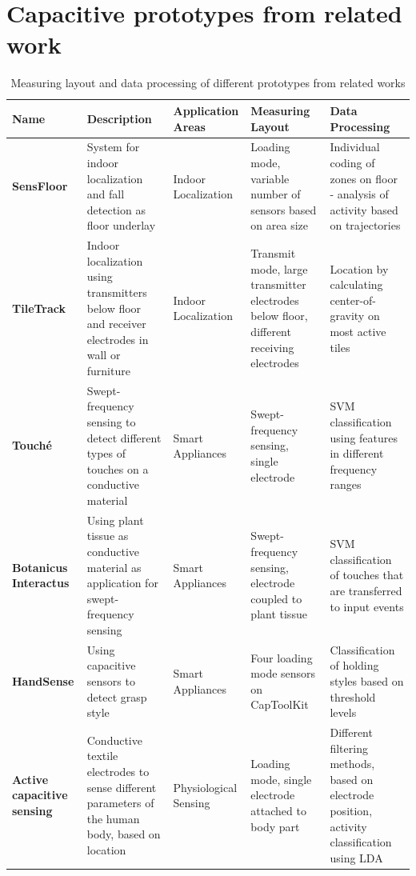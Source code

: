 \section{Capacitive prototypes from related work}
\begin{table}[htbp]	
	\centering
  \footnotesize
  \caption{Measuring layout and data processing of different prototypes from related works}
    \begin{tabularx}{\linewidth}{Xp{3.5cm}Xp{3.5cm}p{3.5cm}}
    \toprule
    \textbf{Name} & \textbf{Description} & \textbf{Application Areas} & \textbf{Measuring Layout} & \textbf{Data Processing} \\
    \midrule
    \textbf{SensFloor \cite{lauterbach2009}} & System for indoor localization and fall detection as floor underlay & Indoor Localization & Loading mode, variable number of sensors based on area size & Individual coding of zones on floor - analysis of activity based on trajectories \\
    \textbf{TileTrack \cite{Valtonen2009a}} & Indoor localization using transmitters below floor and receiver electrodes in wall or furniture & Indoor Localization & Transmit mode, large transmitter electrodes below floor, different receiving electrodes & Location by calculating center-of-gravity on most active tiles \\
    \textbf{Touché \cite{Sato2012}} & Swept-frequency sensing to detect different types of touches on a conductive material & Smart Appliances & Swept-frequency sensing, single electrode & SVM classification using features in different frequency ranges \\
    \textbf{Botanicus Interactus \cite{poupyrev2012botanicus}} & Using plant tissue as conductive material as application for swept-frequency sensing & Smart Appliances & Swept-frequency sensing, electrode coupled to plant tissue & SVM classification of touches that are transferred to input events \\
    \textbf{HandSense \cite{wimmer2009handsense}} & Using capacitive sensors to detect grasp style & Smart Appliances & Four loading mode sensors on CapToolKit & Classification of holding styles based on threshold levels \\
    \textbf{Active capacitive sensing \cite{cheng2010active}} & Conductive textile electrodes to sense different parameters of the human body, based on location & Physiological Sensing & Loading mode, single electrode attached to body part & Different filtering methods, based on electrode position, activity classification using LDA \\

\end{tabularx}
\end{table}
